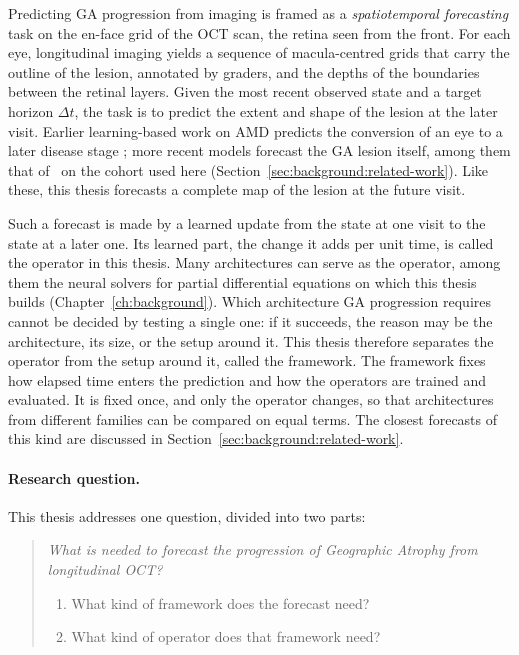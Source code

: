 Predicting GA progression from imaging is framed as a
\emph{spatiotemporal forecasting} task on the en-face grid of the OCT
scan, the retina seen from the front. For each eye, longitudinal imaging
yields a sequence of macula-centred grids that carry the outline of the
lesion, annotated by graders, and the depths of the boundaries between the
retinal layers. Given the
most recent observed state and a target horizon $\Delta t$, the task is to
predict the extent and shape of the lesion at the later visit. Earlier
learning-based work on AMD predicts the conversion of an eye to a later
disease stage \citep{SchmidtErfurth2018, Vogl2021}; more recent models
forecast the GA lesion itself, among them that of~\citet{Mai2024} on the
cohort used here (Section~\ref{sec:background:related-work}). Like these,
this thesis forecasts a complete map of the lesion at the future visit.


Such a forecast is made by a learned update from the state at one visit to
the state at a later one. Its learned part, the change it adds per unit
time, is called the operator in this thesis.
Many architectures can serve as the operator, among them the neural
solvers for partial differential equations on which this thesis builds
(Chapter~\ref{ch:background}). Which architecture GA progression requires
cannot be decided by testing a single one: if it succeeds, the reason may
be the architecture, its size, or the setup around it. This thesis
therefore separates the operator from the setup around it, called the
framework. The framework fixes how elapsed time enters the prediction and
how the operators are trained and evaluated. It is fixed once, and only the
operator changes, so that architectures from different families can be
compared on equal terms. The closest forecasts of this kind are discussed
in Section~\ref{sec:background:related-work}.


\paragraph{Research question.}
\label{par:introduction:research-question}
This thesis addresses one question, divided into two parts:

\begin{quote}
  \itshape What is needed to forecast the progression of Geographic
  Atrophy from longitudinal OCT?
  \begin{enumerate}
    \item What kind of framework does the forecast need?
    \item What kind of operator does that framework need?
  \end{enumerate}
\end{quote}

